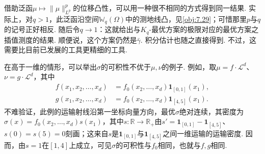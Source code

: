 \begin{remark}\label{obj:4.25}
借助泛函$\mu\mapsto\|\mu\|_{L^p}^p$的位移凸性，可以用一种很不相同的方式得到同一结果. 实际上，对$q>1$，此泛函沿空间$\mathbb W_q(\Omega)$中的测地线凸，见\autoref{obj:7.29}；可惜那里$p$与$q$的记号正好相反. 随后令$q\to1$：这就给出与$K_q$-最优方案的极限对应的最优方案之插值测度的结果. 顺便说，这个方案仍然是$\bar\gamma$. 积分估计也随之直接得到. 不过，这需要比目前已发展的工具更精细的工具.
\end{remark}

\begin{example}\label{obj:4.26}
在高于一维的情形，可以举出$\sigma$的可积性不优于$\mu,\nu$的例子. 例如，取$\mu=f\cdot\mathscr L^d$、$\nu=g\cdot\mathscr L^d$，其中
\begin{align*}
f(x_1,x_2,\ldots,x_d)&=f_0(x_2,\ldots,x_d)\mathbf1_{[0,1]}(x_1),\\
g(x_1,x_2,\ldots,x_d)&=f_0(x_2,\ldots,x_d)\mathbf1_{[4,5]}(x_1).
\end{align*}
不难验证，此例的运输射线沿第一坐标向量方向，最优$\sigma$绝对连续，其密度为$\sigma(x)=f_0(x_2,\ldots,x_d)s(x_1)$，其中$s:\mathbb R\to\mathbb R_+$由$s'=\mathbf1_{[0,1]}-\mathbf1_{[4,5]}$、$s(0)=s(5)=0$刻画；这来自$s$是$\mathbf1_{[0,1]}$与$\mathbf1_{[4,5]}$之间一维运输的运输密度. 因而，由$s=1$在$[1,4]$上成立，可见$\sigma$的可积性与$f_0$相同，也就与$f,g$相同.
\end{example}
